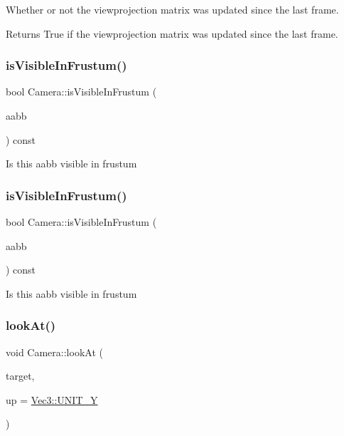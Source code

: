 Whether or not the viewprojection matrix was updated since the last frame. \begin{DoxyReturn}{Returns}
True if the viewprojection matrix was updated since the last frame. 
\end{DoxyReturn}
\mbox{\label{classCamera_ad962c084c9de231d820b981f4b5846c9}} 
\subsubsection{\texorpdfstring{is\+Visible\+In\+Frustum()}{isVisibleInFrustum()}\hspace{0.1cm}{\footnotesize\ttfamily [1/2]}}
{\footnotesize\ttfamily bool Camera\+::is\+Visible\+In\+Frustum (\begin{DoxyParamCaption}\item[{const \hyperlink{classAABB}{A\+A\+BB} $\ast$}]{aabb }\end{DoxyParamCaption}) const}

Is this aabb visible in frustum \mbox{\label{classCamera_ad962c084c9de231d820b981f4b5846c9}} 
\subsubsection{\texorpdfstring{is\+Visible\+In\+Frustum()}{isVisibleInFrustum()}\hspace{0.1cm}{\footnotesize\ttfamily [2/2]}}
{\footnotesize\ttfamily bool Camera\+::is\+Visible\+In\+Frustum (\begin{DoxyParamCaption}\item[{const \hyperlink{classAABB}{A\+A\+BB} $\ast$}]{aabb }\end{DoxyParamCaption}) const}

Is this aabb visible in frustum \mbox{\label{classCamera_af5a1abfa877baf99490da53b35293f86}} 
\subsubsection{\texorpdfstring{look\+At()}{lookAt()}\hspace{0.1cm}{\footnotesize\ttfamily [1/2]}}
{\footnotesize\ttfamily void Camera\+::look\+At (\begin{DoxyParamCaption}\item[{const \hyperlink{classVec3}{Vec3} \&}]{target,  }\item[{const \hyperlink{classVec3}{Vec3} \&}]{up = {\ttfamily \hyperlink{classVec3_a0d569defe7293f1cb108f643230facf5}{Vec3\+::\+U\+N\+I\+T\+\_\+Y}} }\end{DoxyParamCaption})\hspace{0.3cm}{\ttfamily [virtual]}}

